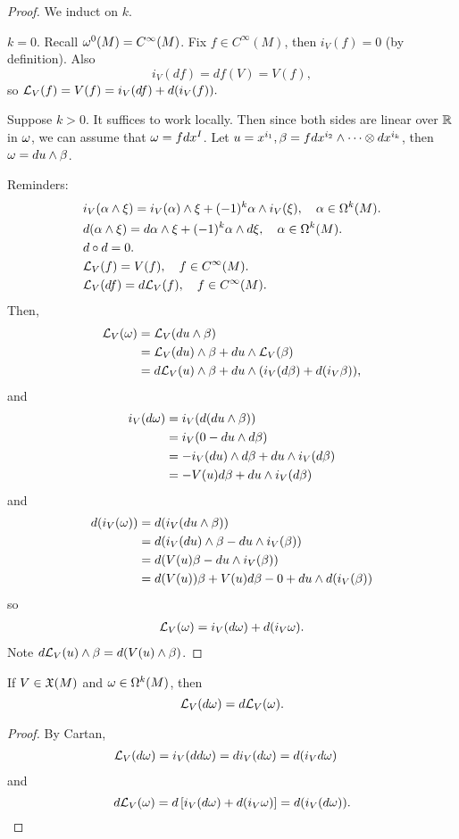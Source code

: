 \begin{proof}
    We induct on $k$. 

    $k=0$. Recall $\omega^0(M) = C^\infty(M)$. Fix $f \in C^\infty(M)$, then $i_V(f) = 0$ (by definition). Also $$i_V(df) = df(V) = V(f),$$ so $\mathcal{L}_V(f) = V(f) = i_V(df) + d(i_V(f)).$

    Suppose $k>0$. It suffices to work locally. Then since both sides are linear over $\mathbb{R}$ in $\omega$, we can assume that $\omega = fdx^I$. Let $u = x^{i_1}, \beta = fdx^{i_2} \wedge \cdots \otimes dx^{i_k}$, then $\omega = du \wedge \beta$. 

    Reminders: 
    \begin{align*}
        &i_V(\alpha \wedge \xi) = i_V(\alpha) \wedge \xi + (-1)^k \alpha \wedge i_V(\xi), \quad \alpha \in \Omega^k(M). \\
        &d(\alpha \wedge \xi) = d\alpha \wedge \xi + (-1)^k \alpha \wedge d\xi, \quad \alpha \in \Omega^k(M). \\
        &d \circ d = 0. \\
        &\mathcal{L}_V(f) = V(f), \quad f \in C^\infty(M). \\
        &\mathcal{L}_V(df) = d\mathcal{L}_V(f), \quad f \in C^\infty(M).
    \end{align*}
    Then, 
    \begin{align*}
    \mathcal{L}_V(\omega) &= \mathcal{L}_V(du \wedge \beta) \\
    &= \mathcal{L}_V(du) \wedge \beta + du \wedge \mathcal{L}_V(\beta) \\
    &= d\mathcal{L}_V(u) \wedge \beta + du \wedge (i_V(d\beta) + d(i_V \beta)),
    \end{align*}
    and 
    \begin{align*}
    i_V(d\omega) &= i_V(d(du \wedge \beta)) \\
    &= i_V(0 - du \wedge d\beta) \\
    &= -i_V(du) \wedge d\beta + du \wedge i_V(d\beta) \\
    &= -V(u)d\beta  + du \wedge i_V(d\beta)
    \end{align*} and 
    \begin{align*}
    d(i_V(\omega)) &= d(i_V(du \wedge \beta)) \\
    &= d(i_V(du) \wedge \beta - du \wedge i_V(\beta)) \\
    &= d(V(u)\beta - du \wedge i_V(\beta)) \\
    &= d(V(u))\beta + V(u)d\beta - 0 + du \wedge d(i_V(\beta))
    \end{align*}
    so 
    \begin{align*}
    \mathcal{L}_V(\omega) = i_V(d\omega) + d(i_V \omega). 
    \end{align*}
    Note $d\mathcal{L}_V(u) \wedge \beta = d(V(u) \wedge \beta)$.
\end{proof}
\begin{corollary}
    If $V \in \frak{X}(M)$ and $\omega \in \Omega^k(M)$, then 
    $$\mathcal{L}_V(d\omega) = d\mathcal{L}_V(\omega).$$
\end{corollary}
\begin{proof}
    By Cartan,
    \begin{align*}
    \mathcal{L}_V(d\omega) &= i_V(dd\omega) = di_V(d\omega)
    = d(i_V d\omega)
    \end{align*}
    and 
    $$d\mathcal{L}_V(\omega) = d\left[i_V(d\omega) + d(i_V \omega) \right] = d(i_V(d\omega)). $$
\end{proof}